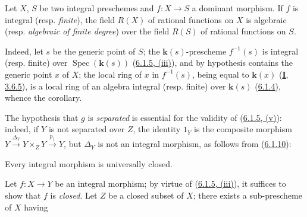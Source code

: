 \begin{corollary}[6.1.8]
\label{II.6.1.8}
Let $X$, $S$ be two integral preschemes and $f:X\to S$ a \textup{dominant} morphism.
If $f$ is integral \textup{(resp. \emph{finite})}, the field $R(X)$ of rational functions on
$X$ is algebraic \textup{(resp. \emph{algebraic of finite degree})} over the field $R(S)$ of
rational functions on $S$.
\end{corollary}

Indeed, let $s$ be the generic point of $S$; the $\boldsymbol{k}(s)$-prescheme
$f^{-1}(s)$ is integral (resp. finite) over
$\operatorname{Spec}(\boldsymbol{k}(s))$ (\hyperref[II.6.1.5]{6.1.5, (iii)}), and by
hypothesis contains the generic point $x$ of $X$; the local ring of $x$ in
$f^{-1}(s)$, being equal to $\boldsymbol{k}(x)$ (\hyperref[I.3.6.5]{\textbf{I}, 3.6.5}), is a
local ring of an algebra integral (resp. finite) over $\boldsymbol{k}(s)$
(\hyperref[II.6.1.4]{6.1.4}), whence the corollary.

\begin{remark}[6.1.9]
\label{II.6.1.9}
The hypothesis that $g$ is \emph{separated} is essential for the validity of
(\hyperref[II.6.1.5]{6.1.5, (v)}): indeed, if $Y$ is not separated over
$Z$, the identity $1_Y$ is the composite morphism
$Y\xrightarrow{\Delta_Y}Y\times_ZY\xrightarrow{p_1}Y$, but $\Delta_Y$ is not
an integral morphism, as follows from
(\hyperref[II.6.1.10]{6.1.10}):
\end{remark}

\begin{proposition}[6.1.10]
\label{II.6.1.10}
Every integral morphism is universally closed.
\end{proposition}

Let $f:X\to Y$ be an integral morphism; by virtue of
(\hyperref[II.6.1.5]{6.1.5, (iii)}), it suffices to show that $f$ is
\emph{closed}. Let $Z$ be a closed subset of $X$; there exists a sub-prescheme of
$X$ having


